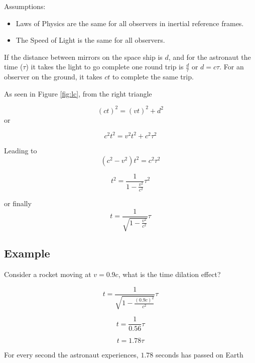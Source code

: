\documentclass[14pt]{memoir}
\begin{document}
Assumptions:
\begin{itemize}
\item Laws of Physics are the same for all observers in inertial reference frames.
\item The Speed of Light is the same for all observers.  
\end{itemize}

If the distance between mirrors on the space ship is $d$, and for the astronaut the time ($\tau$) it takes the light to go complete one round trip is $\frac{d}{\tau}$ or $d = c \tau$. For an observer on the ground, it takes $ct$ to complete the same trip.

As seen in Figure \ref{fig:lc}, from the right triangle

\begin{equation}
(ct)^2 = (vt)^2 + d^2
\end{equation}
or

\begin{equation}
c^2 t^2 = v^2 t^2 + c^2 \tau^2
\end{equation}

Leading to
\begin{equation}
(c^2 - v^2) t^2 = c^2 \tau^2
\end{equation}

\begin{equation}
t^2 = \frac{1}{1 - \frac{v^2}{c^2}} \tau^2
\end{equation}

or finally
\begin{equation}
t = \frac{1}{\sqrt{1 - \frac{v^2}{c^2}}} \tau
\end{equation}

\subsection{Example}
Consider a rocket moving at $v = 0.9c$, what is the time dilation effect?

\begin{equation}
t = \frac{1}{\sqrt{1 - \frac{(0.9c)^2}{c^2}}} \tau
\end{equation}

\begin{equation}
t = \frac{1}{0.56} \tau
\end{equation}

\begin{equation}
t = 1.78 \tau
\end{equation}

For every second the astronaut experiences, $1.78$ seconds has passed on Earth
\end{document}

